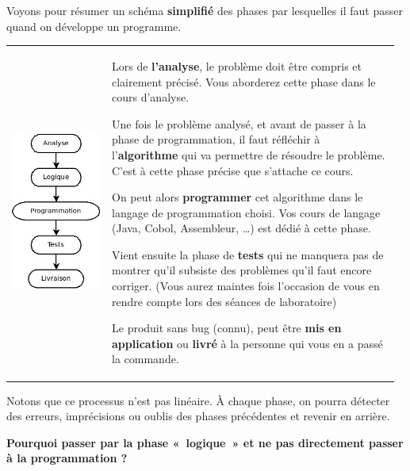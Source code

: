 	Voyons pour résumer un schéma \textbf{simplifié} des phases par
	lesquelles il faut passer quand on développe un programme.

	\begin{tabular}{m{0.25\linewidth}m{0.72\linewidth}}
	\includegraphics[width=3.5cm]{image/intro-phases-develop}
	&
	\begin{liste}
	\item 
		Lors de \textbf{l'analyse}, le problème doit être
		compris et clairement précisé. Vous aborderez cette phase dans le cours
		d'analyse.
	\item
		Une fois le problème analysé, et avant de passer à la phase de
		programmation, il faut réfléchir à l'\textbf{algorithme} qui va
		permettre	de résoudre le problème. C'est à cette phase précise
		que s'attache ce cours.
	\item
		On peut alors \textbf{programmer} cet algorithme dans le langage de
		programmation choisi. Vos cours de langage (Java, Cobol, 
		Assembleur, \dots) est dédié à cette phase.
	\item
		Vient ensuite la phase de \textbf{tests} qui ne manquera pas de montrer
		qu'il subsiste des problèmes qu'il
		faut encore corriger. (Vous aurez maintes fois
		l'occasion de vous en rendre compte lors des
		séances de laboratoire)
	\item
		Le produit sans bug (connu), peut être \textbf{mis en application}
		ou \textbf{livré} à la personne qui vous en a passé la commande.
	\end{liste}
	\\
	\end{tabular}
	
	Notons que ce processus n'est pas linéaire. À chaque
	phase, on pourra détecter des erreurs, imprécisions ou oublis des
	phases précédentes et revenir en arrière.

	\textbf{Pourquoi passer par la phase «~logique~» 
		et ne pas directement passer à la programmation ?}
	
